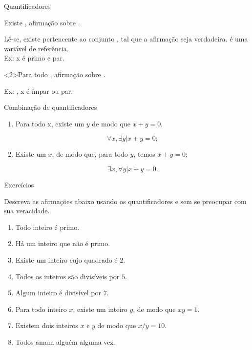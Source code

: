 \begin{frame}{Quantificadores}{}

\begin{block}{Existe} 
, afirmação sobre .

\bigskip
Lê-se, existe  pertencente ao conjunto , tal 
que a afirmação seja verdadeira.  é uma variável de 
referência.\\

\bigskip
Ex:  x é primo e par.
\end{block}

\begin{block}<2>{Para todo} 
, afirmação sobre .

\bigskip

Ex: , x é ímpar ou par.
\end{block}  

\end{frame}

\begin{frame}{Combinação de quantificadores}

  \begin{enumerate}[<+-| alert@+>]
  \item Para todo x, existe um $y$ de modo que $x+y=0$,
    
    \[\forall x, \exists y | x+y=0;\]
  \item Existe um $x$, de modo que, para todo $y$, temos $x+y=0$;

    \[\exists x, \forall y | x+y=0.\]
  \end{enumerate}
  
\end{frame}

\begin{frame}{Exercícios}

  Descreva as afirmações abaixo usando os quantificadores e 
  sem se preocupar com sua veracidade.
 
  \begin{enumerate}
  \item Todo inteiro é primo.
  \item Há um inteiro que não é primo.
  \item Existe um inteiro cujo quadrado é $2$.
  \item Todos os inteiros são divisíveis por $5$.
  \item Algum inteiro é divisível por $7$.
  \item Para todo inteiro $x$, existe um inteiro $y$, de modo que 
    $xy=1$.
  \item Existem dois inteiros $x$ e $y$ de modo que $x/y=10$.
  \item Todos amam alguém alguma vez.
  \end{enumerate}

\end{frame}

